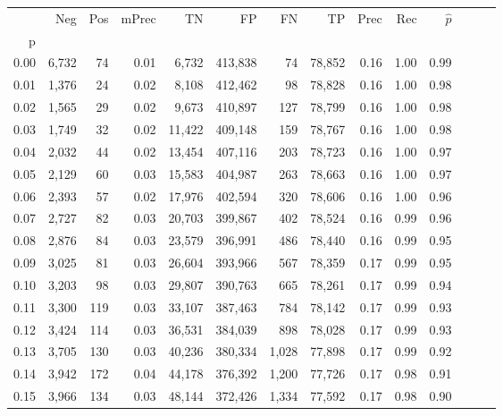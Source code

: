 \begin{tabular}{rrrrrrrrrrrrrr}
\toprule
{} &    Neg &    Pos & mPrec &       TN &       FP &      FN &      TP &  Prec &   Rec & $\hat{p}$ \\
p    &        &        &       &          &          &         &         &       &       &           \\
\midrule
0.00 &  6,732 &     74 &  0.01 &    6,732 &  413,838 &      74 &  78,852 &  0.16 &  1.00 &      0.99 \\
0.01 &  1,376 &     24 &  0.02 &    8,108 &  412,462 &      98 &  78,828 &  0.16 &  1.00 &      0.98 \\
0.02 &  1,565 &     29 &  0.02 &    9,673 &  410,897 &     127 &  78,799 &  0.16 &  1.00 &      0.98 \\
0.03 &  1,749 &     32 &  0.02 &   11,422 &  409,148 &     159 &  78,767 &  0.16 &  1.00 &      0.98 \\
0.04 &  2,032 &     44 &  0.02 &   13,454 &  407,116 &     203 &  78,723 &  0.16 &  1.00 &      0.97 \\
0.05 &  2,129 &     60 &  0.03 &   15,583 &  404,987 &     263 &  78,663 &  0.16 &  1.00 &      0.97 \\
0.06 &  2,393 &     57 &  0.02 &   17,976 &  402,594 &     320 &  78,606 &  0.16 &  1.00 &      0.96 \\
0.07 &  2,727 &     82 &  0.03 &   20,703 &  399,867 &     402 &  78,524 &  0.16 &  0.99 &      0.96 \\
0.08 &  2,876 &     84 &  0.03 &   23,579 &  396,991 &     486 &  78,440 &  0.16 &  0.99 &      0.95 \\
0.09 &  3,025 &     81 &  0.03 &   26,604 &  393,966 &     567 &  78,359 &  0.17 &  0.99 &      0.95 \\
0.10 &  3,203 &     98 &  0.03 &   29,807 &  390,763 &     665 &  78,261 &  0.17 &  0.99 &      0.94 \\
0.11 &  3,300 &    119 &  0.03 &   33,107 &  387,463 &     784 &  78,142 &  0.17 &  0.99 &      0.93 \\
0.12 &  3,424 &    114 &  0.03 &   36,531 &  384,039 &     898 &  78,028 &  0.17 &  0.99 &      0.93 \\
0.13 &  3,705 &    130 &  0.03 &   40,236 &  380,334 &   1,028 &  77,898 &  0.17 &  0.99 &      0.92 \\
0.14 &  3,942 &    172 &  0.04 &   44,178 &  376,392 &   1,200 &  77,726 &  0.17 &  0.98 &      0.91 \\
0.15 &  3,966 &    134 &  0.03 &   48,144 &  372,426 &   1,334 &  77,592 &  0.17 &  0.98 &      0.90 \\

\end{tabular}
